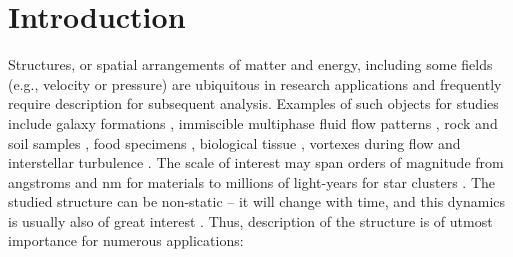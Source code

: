 \documentclass[reprint,amsmath,amssymb,aps,pre,showkeys,showpacs]{revtex4-1}
\begin{document}

\maketitle

\section{Introduction}
\label{sec:intro}
Structures, or spatial arrangements of matter and energy, including some fields
(e.g., velocity or pressure) are ubiquitous in research applications and
frequently require description for subsequent analysis. Examples of such objects
for studies include galaxy formations \cite{springel2006}, immiscible multiphase
fluid flow patterns \cite{hopkins2015new,balashov2021}, rock and soil samples
\cite{rozenbaum2014,karsanina2015,ledesma2018,chen2020super,prokhorov2021digital,vogel2010},
food specimens \cite{derossi2019,nagdalian2021}, biological tissue
\cite{park2020}, vortexes during flow \cite{gorbunova2016precessing} and
interstellar turbulence \cite{portillo2018developing}. The scale of interest may
span orders of magnitude from angstroms and nm for materials
\cite{garum2020,gerke2021,khlyupin2023molecular} to millions of light-years for
star clusters \cite{takada2003three,hopkins2013stars}. The studied structure can
be non-static -- it will change with time, and this dynamics is usually also of
great interest \cite{jiao2013,fomin2023soil}. Thus, description of the structure
is of utmost importance for numerous applications:
\end{document}
